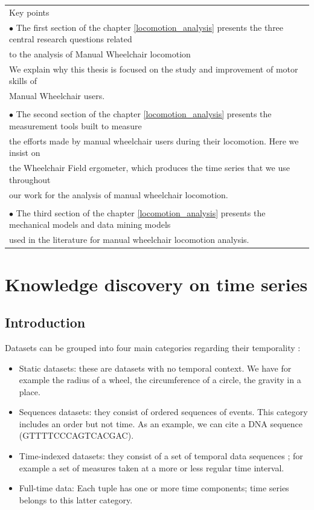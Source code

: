\begin{table}[ht]
\centering
\begin{tabular}{|l|}

\hline
\rowcolor{LavenderBlush}
Key points\\
$\bullet$ The first section of the chapter \ref{locomotion_analysis} presents the three central research questions related \\ to the analysis of Manual Wheelchair locomotion \\ \; We explain why this thesis is focused on the study and improvement of motor skills of\\ Manual Wheelchair users. \\
\\
$\bullet$ The second section of the chapter \ref{locomotion_analysis} presents the measurement tools built to measure \\ the efforts  made by manual wheelchair users during their locomotion. Here we insist on \\ the Wheelchair Field  ergometer, which  produces the time series that we use throughout \\ our work for  the analysis of manual wheelchair locomotion. \\
\\
$\bullet$ The third section of the chapter \ref{locomotion_analysis} presents the mechanical models and data mining models \\ used in the literature for manual wheelchair locomotion analysis.\\

\hline
\end{tabular}
\end{table}





\chapter{Knowledge discovery on time series}
\label{kdd}

\section{Introduction}

Datasets can be grouped into four main categories regarding their temporality \cite{roddick2002survey}: 
\begin{itemize}
\item Static datasets: these are datasets with no temporal context. We have for example the radius of a wheel, the circumference of a circle, the gravity in a place.
\item Sequences datasets: they consist of   ordered sequences of events. This category includes an order but not time. As an example, we can cite a DNA sequence (GTTTTCCCAGTCACGAC).
\item Time-indexed datasets: they consist of a set of temporal data sequences ; for example a set of measures taken at a more or less regular time interval.
\item Full-time data: Each tuple has one or more time components; time series belongs to this latter category.
\end{itemize}

